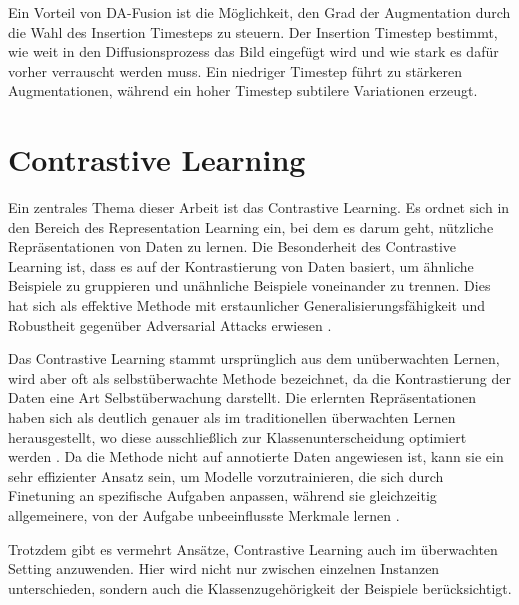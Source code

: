 Ein Vorteil von DA-Fusion ist die Möglichkeit, den Grad der Augmentation durch die Wahl des Insertion Timesteps zu steuern. Der Insertion Timestep bestimmt, wie weit in den Diffusionsprozess das Bild eingefügt wird und wie stark es dafür vorher verrauscht werden muss. Ein niedriger Timestep führt zu stärkeren Augmentationen, während ein hoher Timestep subtilere Variationen erzeugt.



\section{Contrastive Learning} \label{sec:contrastive-learning}

Ein zentrales Thema dieser Arbeit ist das Contrastive Learning. Es ordnet sich in den Bereich des Representation Learning ein, bei dem es darum geht, nützliche Repräsentationen von Daten zu lernen. Die Besonderheit des Contrastive Learning ist, dass es auf der Kontrastierung von Daten basiert, um ähnliche Beispiele zu gruppieren und unähnliche Beispiele voneinander zu trennen. Dies hat sich als effektive Methode mit erstaunlicher Generalisierungsfähigkeit und Robustheit gegenüber Adversarial Attacks erwiesen \parencite{Liu2021understandimprovecontrastivelearning}.

Das Contrastive Learning stammt ursprünglich aus dem unüberwachten Lernen, wird aber oft als selbstüberwachte Methode bezeichnet, da die Kontrastierung der Daten eine Art Selbstüberwachung darstellt. Die erlernten Repräsentationen haben sich als deutlich genauer als im traditionellen überwachten Lernen herausgestellt, wo diese ausschließlich zur Klassenunterscheidung optimiert werden \parencite{Keshtmand2022contrastood}. Da die Methode nicht auf annotierte Daten angewiesen ist, kann sie ein sehr effizienter Ansatz sein, um Modelle vorzutrainieren, die sich durch Finetuning an spezifische Aufgaben anpassen, während sie gleichzeitig allgemeinere, von der Aufgabe unbeeinflusste Merkmale lernen \parencite{Radford2021learningtransferablevisualmodels}.

Trotzdem gibt es vermehrt Ansätze, Contrastive Learning auch im überwachten Setting anzuwenden. Hier wird nicht nur zwischen einzelnen Instanzen unterschieden, sondern auch die Klassenzugehörigkeit der Beispiele berücksichtigt.

